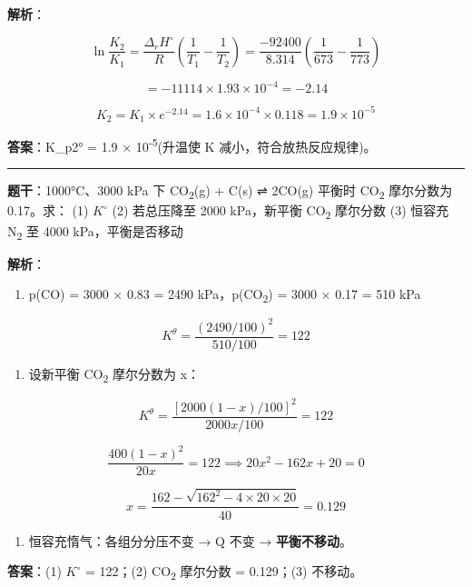 \textbf{解析}：

\[\ln\frac{K_2}{K_1} = \frac{\Delta_rH^\circ}{R}\left(\frac{1}{T_1} - \frac{1}{T_2}\right) = \frac{-92400}{8.314}\left(\frac{1}{673} - \frac{1}{773}\right)\]

\[= -11114 \times 1.93 \times 10^{-4} = -2.14\]

\[K_2 = K_1 \times e^{-2.14} = 1.6 \times 10^{-4} \times 0.118 = 1.9 \times 10^{-5}\]

\textbf{答案}：K\_p2° = 1.9 × 10\textsuperscript{-5}(升温使 K 减小，符合放热反应规律)。

\begin{center}\rule{0.5\linewidth}{0.5pt}\end{center}

\textbf{题干}：1000°C、3000 kPa 下 CO\textsubscript{2}(g) + C(s) ⇌ 2CO(g) 平衡时 CO\textsubscript{2} 摩尔分数为 0.17。求：
(1) \(K^{\circ}\)
(2) 若总压降至 2000 kPa，新平衡 CO\textsubscript{2} 摩尔分数
(3) 恒容充 N\textsubscript{2} 至 4000 kPa，平衡是否移动

\textbf{解析}：

\begin{enumerate}
\def\labelenumi{(\arabic{enumi})}
\tightlist
\item
  p(CO) = 3000 × 0.83 = 2490 kPa，p(CO\textsubscript{2}) = 3000 × 0.17 = 510 kPa
\end{enumerate}

\[K^\theta = \frac{(2490/100)^2}{510/100} = 122\]

\begin{enumerate}
\def\labelenumi{(\arabic{enumi})}
\setcounter{enumi}{1}
\tightlist
\item
  设新平衡 CO\textsubscript{2} 摩尔分数为 x：
\end{enumerate}

\[K^\theta = \frac{[2000(1-x)/100]^2}{2000x/100} = 122\]

\[\frac{400(1-x)^2}{20x} = 122 \implies 20x^2 - 162x + 20 = 0\]

\[x = \frac{162 - \sqrt{162^2 - 4 \times 20 \times 20}}{40} = 0.129\]

\begin{enumerate}
\def\labelenumi{(\arabic{enumi})}
\setcounter{enumi}{2}
\tightlist
\item
  恒容充惰气：各组分分压不变 → Q 不变 → \textbf{平衡不移动}。
\end{enumerate}

\textbf{答案}：(1) \(K^{\circ}\) = 122；(2) CO\textsubscript{2} 摩尔分数 = 0.129；(3) 不移动。

